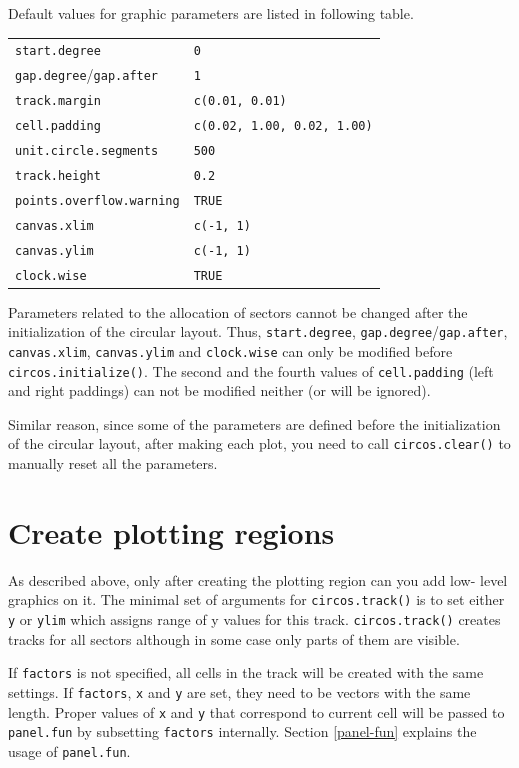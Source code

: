 \documentclass[]{book}
\begin{document}
Default values for graphic parameters are listed in following table.

\begin{longtable}[]{@{}ll@{}}
\toprule
\texttt{start.degree} & \texttt{0}\tabularnewline
\texttt{gap.degree}/\texttt{gap.after} & \texttt{1}\tabularnewline
\texttt{track.margin} & \texttt{c(0.01,\ 0.01)}\tabularnewline
\texttt{cell.padding} &
\texttt{c(0.02,\ 1.00,\ 0.02,\ 1.00)}\tabularnewline
\texttt{unit.circle.segments} & \texttt{500}\tabularnewline
\texttt{track.height} & \texttt{0.2}\tabularnewline
\texttt{points.overflow.warning} & \texttt{TRUE}\tabularnewline
\texttt{canvas.xlim} & \texttt{c(-1,\ 1)}\tabularnewline
\texttt{canvas.ylim} & \texttt{c(-1,\ 1)}\tabularnewline
\texttt{clock.wise} & \texttt{TRUE}\tabularnewline
\bottomrule
\end{longtable}

Parameters related to the allocation of sectors cannot be changed after
the initialization of the circular layout. Thus, \texttt{start.degree},
\texttt{gap.degree}/\texttt{gap.after}, \texttt{canvas.xlim},
\texttt{canvas.ylim} and \texttt{clock.wise} can only be modified before
\texttt{circos.initialize()}. The second and the fourth values of
\texttt{cell.padding} (left and right paddings) can not be modified
neither (or will be ignored).

Similar reason, since some of the parameters are defined before the
initialization of the circular layout, after making each plot, you need
to call \texttt{circos.clear()} to manually reset all the parameters.

\section{Create plotting regions}\label{create-plotting-regions}

As described above, only after creating the plotting region can you add
low- level graphics on it. The minimal set of arguments for
\texttt{circos.track()} is to set either \texttt{y} or \texttt{ylim}
which assigns range of y values for this track. \texttt{circos.track()}
creates tracks for all sectors although in some case only parts of them
are visible.

If \texttt{factors} is not specified, all cells in the track will be
created with the same settings. If \texttt{factors}, \texttt{x} and
\texttt{y} are set, they need to be vectors with the same length. Proper
values of \texttt{x} and \texttt{y} that correspond to current cell will
be passed to \texttt{panel.fun} by subsetting \texttt{factors}
internally. Section \ref{panel-fun} explains the usage of
\texttt{panel.fun}.
\end{document}
